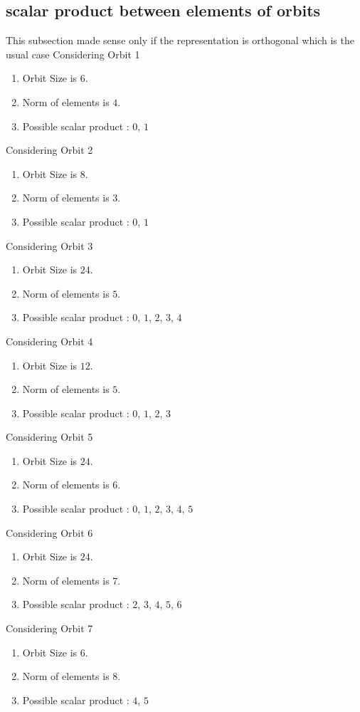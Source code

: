 \documentclass[12pt]{article}
\begin{document}
\subsection{scalar product between elements of orbits}
\noindent This subsection made sense only if the representation is orthogonal which is the usual case
Considering Orbit 1
\begin{enumerate}
\item Orbit Size is $6$.
\item Norm of elements is $4$.
\item Possible scalar product : $0$, $1$
\end{enumerate}
Considering Orbit 2
\begin{enumerate}
\item Orbit Size is $8$.
\item Norm of elements is $3$.
\item Possible scalar product : $0$, $1$
\end{enumerate}
Considering Orbit 3
\begin{enumerate}
\item Orbit Size is $24$.
\item Norm of elements is $5$.
\item Possible scalar product : $0$, $1$, $2$, $3$, $4$
\end{enumerate}
Considering Orbit 4
\begin{enumerate}
\item Orbit Size is $12$.
\item Norm of elements is $5$.
\item Possible scalar product : $0$, $1$, $2$, $3$
\end{enumerate}
Considering Orbit 5
\begin{enumerate}
\item Orbit Size is $24$.
\item Norm of elements is $6$.
\item Possible scalar product : $0$, $1$, $2$, $3$, $4$, $5$
\end{enumerate}
Considering Orbit 6
\begin{enumerate}
\item Orbit Size is $24$.
\item Norm of elements is $7$.
\item Possible scalar product : $2$, $3$, $4$, $5$, $6$
\end{enumerate}
Considering Orbit 7
\begin{enumerate}
\item Orbit Size is $6$.
\item Norm of elements is $8$.
\item Possible scalar product : $4$, $5$
\end{enumerate}
\end{document}

